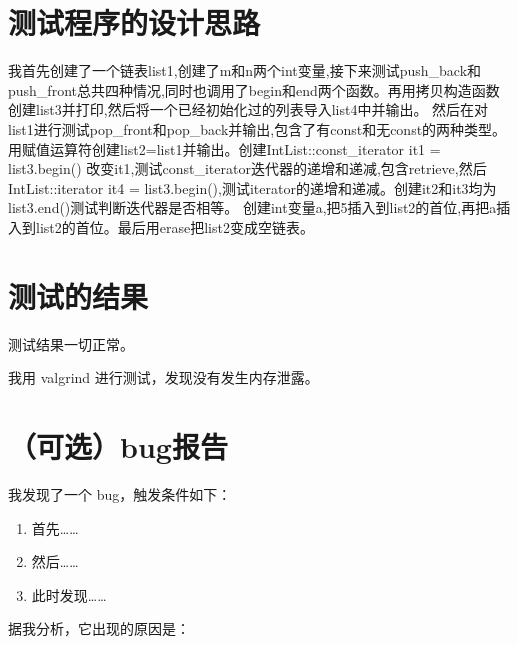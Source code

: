 \documentclass[UTF8]{ctexart}
\begin{document}
\pagestyle{fancy}
\fancyhead{}

\section{测试程序的设计思路}

我首先创建了一个链表list1,创建了m和n两个int变量,接下来测试push_back和push_front总共四种情况,同时也调用了begin和end两个函数。再用拷贝构造函数创建list3并打印,然后将一个已经初始化过的列表导入list4中并输出。
然后在对list1进行测试pop_front和pop_back并输出,包含了有const和无const的两种类型。用赋值运算符创建list2=list1并输出。创建IntList::const_iterator it1 = list3.begin()
改变it1,测试const_iterator迭代器的递增和递减,包含retrieve,然后IntList::iterator it4 = list3.begin(),测试iterator的递增和递减。创建it2和it3均为list3.end()测试判断迭代器是否相等。
创建int变量a,把5插入到list2的首位,再把a插入到list2的首位。最后用erase把list2变成空链表。

\section{测试的结果}

测试结果一切正常。

我用 valgrind 进行测试，发现没有发生内存泄露。

\section{（可选）bug报告}

我发现了一个 bug，触发条件如下：

\begin{enumerate}
    \item 首先……
    \item 然后……
    \item 此时发现……
\end{enumerate}

据我分析，它出现的原因是：
\end{document}
